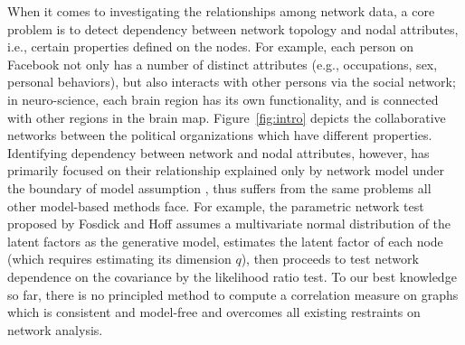 \documentclass[11pt]{article}
\theoremstyle{definition}
\begin{document}
When it comes to investigating the relationships among network data, a core problem is to detect dependency between network topology and nodal attributes, i.e., certain properties defined on the nodes. For example, each person on Facebook not only has a number of distinct attributes (e.g., occupations, sex, personal behaviors), but also interacts with other persons via the social network; in neuro-science, each brain region has its own functionality, and is connected with other regions in the brain map. Figure~\ref{fig:intro} depicts the collaborative networks between the political organizations which have different properties. Identifying dependency between network and nodal attributes, however, has primarily focused on their relationship explained only by network model under the boundary of model assumption \cite{wasserman1996logit, fosdick2015testing, howard2016understanding}, thus suffers from the same problems all other model-based methods face. For example, the parametric network test proposed by Fosdick and Hoff \cite{fosdick2015testing} assumes a multivariate normal distribution of the latent factors as the generative model, estimates the latent factor of each node (which requires estimating its dimension $q$), then proceeds to test network dependence on the covariance by the likelihood ratio test. To our best knowledge so far, there is no principled method to compute a correlation measure on graphs which is consistent and model-free and overcomes all existing restraints on network analysis. 
\end{document}
